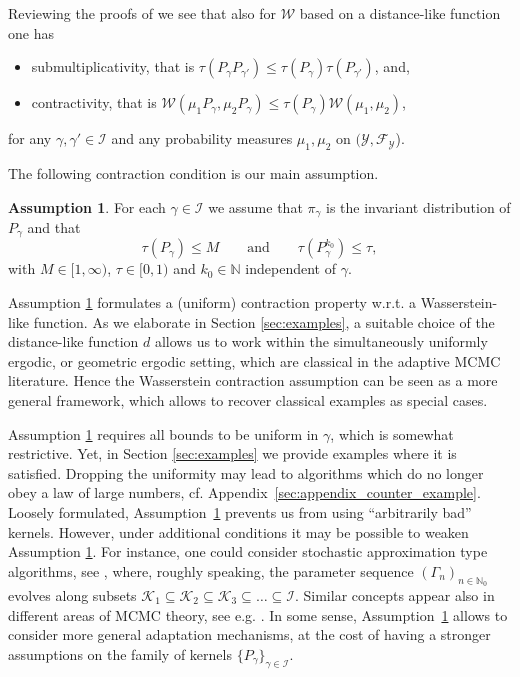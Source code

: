 \documentclass[12pt]{article}
\theoremstyle{definition}
\newtheorem{ass}[thm]{Assumption}
\newcommand{\N}{\mathbb{N}}
\newcommand{\cY}{\mathcal{Y}}
\begin{document}
Reviewing the proofs of \cite[Proposition 14.3 and Proposition 14.4]{dobrushin96} we see that also for $\mathcal{W}$ based on a distance-like function one has 
\begin{itemize}
	\item[i)] submultiplicativity, that is $\tau(P_\gamma P_{\gamma'}) \leq \tau(P_\gamma) \tau(P_{\gamma'})$, and,
	\item[ii)] contractivity, that is $\mathcal{W}(\mu_1 P_\gamma , \mu_2 P_\gamma) \leq \tau(P_\gamma) \mathcal{W}(\mu_1, \mu_2)$,
\end{itemize}
for any $\gamma, \gamma'\in \mathcal{I}$ and any probability measures $\mu_1, \mu_2$ on $(\cY , \mathcal{F}_\cY$). 


The following contraction condition is our main assumption. 
\begin{ass}\label{assumption_main}
	For each $\gamma \in \mathcal{I}$ we assume that $\pi_\gamma$ is the invariant distribution of $P_\gamma$ and that 
	\[
	\tau(P_\gamma) \leq M \qquad \text{and} \qquad
	\tau(P_\gamma^{k_0}) \leq \tau,
	\]
	with $M \in [1, \infty)$, $\tau \in [0,1)$ and $k_0 \in \N$ independent of $\gamma$.
\end{ass}


	Assumption \ref{assumption_main} formulates a (uniform) contraction property w.r.t. a Wasserstein-like function.
	As we elaborate in Section \ref{sec:examples}, a suitable choice of the distance-like function $d$ allows us to work within the simultaneously uniformly ergodic, or geometric ergodic setting, which are classical in the adaptive MCMC literature.
	Hence the Wasserstein contraction assumption can be seen as a more general framework, which allows to recover classical examples as special cases. 
	
	Assumption \ref{assumption_main} requires all bounds to be uniform in $\gamma$, which is somewhat restrictive. 
	Yet, in Section \ref{sec:examples} we provide examples where it is satisfied. 
Dropping the uniformity may lead to algorithms which do no longer obey a law of large numbers, cf. Appendix~\ref{sec:appendix_counter_example}. 
		Loosely formulated, Assumption~\ref{assumption_main} prevents us from using 
		``arbitrarily bad'' kernels. However, under
	additional conditions it may be possible to weaken Assumption \ref{assumption_main}. 
	For instance, one could consider stochastic approximation type algorithms, see \cite{andrieu2006ergodicity,saksman2010ergodicity}, where, roughly speaking, the parameter sequence $(\Gamma_n)_{ n \in \N_0}$ evolves along subsets $\mathcal{K}_1 \subseteq \mathcal{K}_2 \subseteq \mathcal{K}_3 \subseteq \dots \subseteq \mathcal{I}$.
	Similar concepts appear also in different areas of MCMC theory, see e.g. \cite{Fort2003convergence}.
	In some sense, Assumption~\ref{assumption_main} allows to consider more general adaptation mechanisms, at the cost of having a stronger assumptions on the family of kernels $\{P_\gamma\}_{\gamma\in \mathcal{I}}$.
\end{document}
